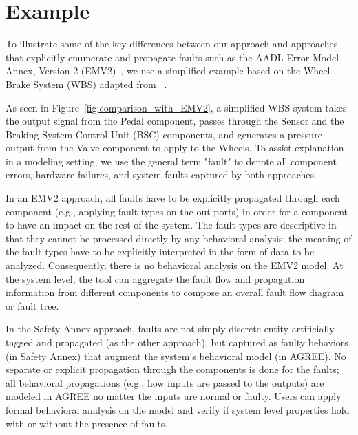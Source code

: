 \section{Example}
\label{sec:comparison_with_EMV2}

To illustrate some of the key differences between our approach and approaches that explicitly enumerate and propagate faults such as the AADL Error Model Annex, Version 2 (EMV2)~\cite{EMV2}, we use a simplified example based on the Wheel Brake System (WBS) adapted from ~\cite{WBS_EMV2_Example}.

As seen in Figure~\ref{fig:comparison_with_EMV2}, a simplified WBS system takes the output signal from the Pedal component, passes through the Sensor and the Braking System Control Unit (BSC) components, and generates a pressure output from the Valve component to apply to the Wheels. To assist explanation in a modeling setting, we use the general term "fault" to denote all component errors, hardware failures, and system faults captured by both approaches.

In an EMV2 approach, all faults have to be explicitly propagated through each component (e.g., applying fault types on the out ports) in order for a component to have an impact on the rest of the system. The fault types are descriptive in that they cannot be processed directly by any behavioral analysis; the meaning of the fault types have to be explicitly interpreted in the form of data to be analyzed. Consequently, there is no behavioral analysis on the EMV2 model. At the system level, the tool can aggregate the fault flow and propagation information from different components to compose an overall fault flow diagram or fault tree.

In the Safety Annex approach, faults are not simply discrete entity artificially tagged and propagated (as the other approach), but captured as faulty behaviors (in Safety Annex) that augment the system's behavioral model (in AGREE). No separate or explicit propagation through the components is done for the faults; all behavioral propagations (e.g., how inputs are passed to the outputs) are modeled in AGREE no matter the inputs are normal or faulty. Users can apply formal behavioral analysis on the model and verify if system level properties hold with or without the presence of faults.


